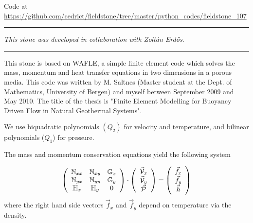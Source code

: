 


\begin{center}
Code at \url{https://github.com/cedrict/fieldstone/tree/master/python_codes/fieldstone_107}
\end{center}

\par\noindent\rule{\textwidth}{0.4pt}

{\sl This stone was developed in collaboration with Zolt{\'a}n Erd{\H{o}}s}. 

\par\noindent\rule{\textwidth}{0.4pt}




This stone is based on WAFLE, a simple finite element code which solves the mass, momentum and heat transfer 
equations in two dimensions in a porous media. This  code was written by M. Saltnes (Master student at 
the Dept. of Mathematics, University of Bergen) and myself between September 2009 and May 2010. The title 
of the thesis is "Finite Element Modelling for Buoyancy Driven Flow in Natural Geothermal Systems". 

\vspace{1cm}

We use biquadratic polynomials $(Q_2)$ for velocity and temperature, 
and bilinear polynomials ($Q_1$) for pressure.

The mass and momentum conservation equations yield the following system 

\[
\left(
\begin{array}{ccc}
{\mathbb{N}}_{xx} & {\mathbb{N}}_{xy} & {\mathbb{G}}_x \\
{\mathbb{N}}_{yx} & {\mathbb{N}}_{yy} & {\mathbb{G}}_y \\
{\mathbb{H}}_{x} & {\mathbb{H}}_y & 0 
\end{array}
\right)
\cdot
\left(
\begin{array}{c}
\vec{\cal V}_x \\
\vec{\cal V}_y \\ 
\vec{\cal P}
\end{array}
\right)
=
\left(
\begin{array}{c}
\vec{f}_x \\ 
\vec{f}_y \\ 
\vec{h}
\end{array}
\right)
\]
where the right hand side vectors $\vec{f}_x $ and $\vec{f}_y$ depend on temperature via the density. 

